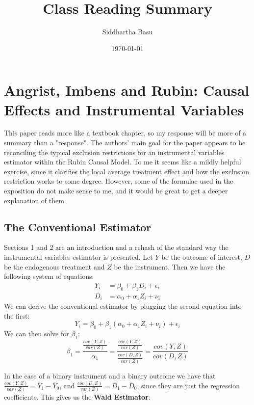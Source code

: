 \documentclass[12 pt, leqno]{article}
\begin{document}
\title{Class Reading Summary}
\author{Siddhartha Basu}
\date{\today}
\maketitle

\section{Angrist, Imbens and Rubin: Causal Effects and Instrumental Variables}

This paper reads more like a textbook chapter, so my response will be more of a summary than a "response". The authors' main goal for the paper appears to be reconciling the typical exclusion restrictions for an instrumental variables estimator within the Rubin Causal Model. To me it seems like a mildly helpful exercise, since it clarifies the local average treatment effect  and how the exclusion restriction works to some degree. However, some of the formulae used in the exposition do not make sense to me, and it would be great to get a deeper explanation of them. 

\subsection{The Conventional Estimator}

Sections 1 and 2 are an introduction and a rehash of the standard way the instrumental variables estimator is presented. Let $Y$ be the outcome of interest, $D$ be the endogenous treatment and $Z$ be the instrument. Then we have the following system of equations:
\begin{align*}
Y_i &= \beta_0 + \beta_1 D_i + \epsilon_i \\
D_i &= \alpha_0 + \alpha_1 Z_i + \nu_i 
\end{align*}
We can derive the conventional estimator by plugging the second equation into the first:
$$ Y_i = \beta_0 + \beta_1 (\alpha_0 + \alpha_1 Z_i + \nu_i )+ \epsilon_i $$
We can then solve for $\beta_1$:
$$\beta_1 = \frac{\frac{cov(Y,Z)}{var(Z)}}{\alpha_1} = \frac{\frac{cov(Y,Z)}{var(Z)}}{\frac{cov(D,Z)}{var(Z)}} = \frac{cov(Y,Z)}{cov(D,Z)}$$

In the case of a binary instrument and a binary outcome we have that $\frac{cov(Y,Z)}{var(Z)} = \bar{Y}_1 - \bar{Y}_0$, and $\frac{cov(D,Z)}{var(Z)} = \bar{D}_1 - \bar{D}_0$, since they are just the regression coefficients. This gives us the \textbf{Wald Estimator}:
\end{document}
